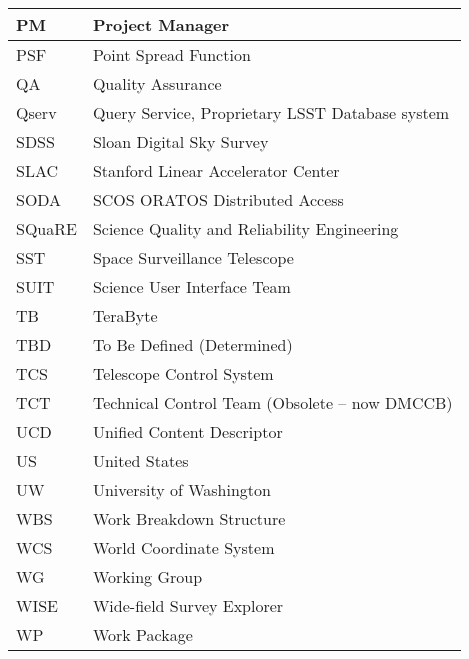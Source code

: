 \begin{longtable}{|l|p{}|}
PM&Project Manager \\\hline
PSF&Point Spread Function \\\hline
QA&Quality Assurance \\\hline
Qserv&Query Service, Proprietary LSST Database system \\\hline
SDSS&Sloan Digital Sky Survey \\\hline
SLAC&Stanford Linear Accelerator Center \\\hline
SODA&SCOS ORATOS Distributed Access \\\hline
SQuaRE&Science Quality and Reliability Engineering \\\hline
SST&Space Surveillance Telescope \\\hline
SUIT&Science User Interface Team \\\hline
TB&TeraByte \\\hline
TBD&To Be Defined (Determined) \\\hline
TCS&Telescope Control System \\\hline
TCT&Technical Control Team (Obsolete -- now DMCCB) \\\hline
UCD&Unified Content Descriptor \\\hline
US&United States \\\hline
UW&University of Washington \\\hline
WBS&Work Breakdown Structure \\\hline
WCS&World Coordinate System \\\hline
WG&Working Group \\\hline
WISE&Wide-field Survey Explorer \\\hline
WP&Work Package \\\hline
\end{longtable} 
